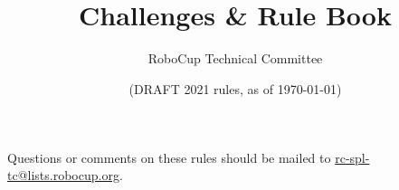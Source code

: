 \documentclass[12pt]{article}
\title{\leaguename\\
Challenges \& Rule Book}
\author{RoboCup Technical Committee}
\date{(DRAFT 2021 rules, as of \today)}
\begin{document}
  \maketitle

  \begin{center}
  Questions or comments on these rules should be mailed to \url{rc-spl-tc@lists.robocup.org}.
  \end{center}

  \vfill

  \tableofcontents
  \setcounter{tocdepth}{3}

  \thispagestyle{fancy}

  \clearpage

  \cfoot{\thepage}
  \setcounter{page}{1}

  \newpage

  
  \newpage
  
  \newpage
  
  \newpage
  
  \newpage
  
  \newpage
  
\end{document}
